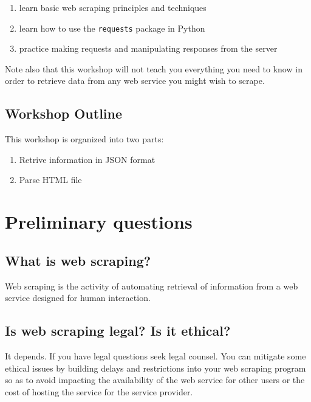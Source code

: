 \documentclass[]{book}
\providecommand{\tightlist}{%
  \setlength{\itemsep}{0pt}\setlength{\parskip}{0pt}}
\begin{document}
\begin{enumerate}
\def\labelenumi{\arabic{enumi}.}
\tightlist
\item
  learn basic web scraping principles and techniques
\item
  learn how to use the \texttt{requests} package in Python
\item
  practice making requests and manipulating responses from the server
\end{enumerate}

Note also that this workshop will not teach you everything you need to
know in order to retrieve data from any web service you might wish to
scrape.

\hypertarget{workshop-outline-3}{%
\subsection{Workshop Outline}\label{workshop-outline-3}}

This workshop is organized into two parts:

\begin{enumerate}
\def\labelenumi{\arabic{enumi}.}
\tightlist
\item
  Retrive information in JSON format
\item
  Parse HTML file
\end{enumerate}

\hypertarget{preliminary-questions}{%
\section{Preliminary questions}\label{preliminary-questions}}

\hypertarget{what-is-web-scraping}{%
\subsection{What is web scraping?}\label{what-is-web-scraping}}

Web scraping is the activity of automating retrieval of information
from a web service designed for human interaction.

\hypertarget{is-web-scraping-legal-is-it-ethical}{%
\subsection{Is web scraping legal? Is it ethical?}\label{is-web-scraping-legal-is-it-ethical}}

It depends. If you have legal questions seek legal counsel. You can
mitigate some ethical issues by building delays and restrictions into
your web scraping program so as to avoid impacting the availability of
the web service for other users or the cost of hosting the service for
the service provider.
\end{document}
